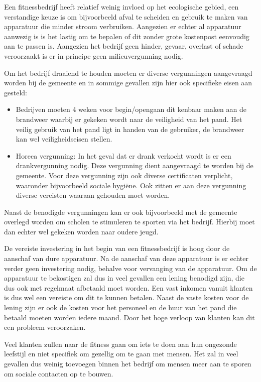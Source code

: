 Een fitnessbedrijf heeft relatief weinig invloed op het ecologische gebied, een verstandige keuze is om bijvoorbeeld afval te scheiden en gebruik te maken van apparatuur die minder stroom verbruiken. Aangezien er echter al apparatuur aanwezig is is het lastig om te bepalen of dit zonder grote kostenpost eenvoudig aan te passen is. Aangezien het bedrijf geen hinder, gevaar, overlast of schade veroorzaakt is er in principe geen milieuvergunning nodig.

 Om het bedrijf draaiend te houden moeten er diverse vergunningen aangevraagd worden bij de gemeente en in sommige gevallen zijn hier ook specifieke eisen aan gesteld:
\begin{itemize}
        \item Bedrijven moeten 4 weken voor begin/opengaan dit kenbaar maken aan de brandweer waarbij er gekeken wordt naar de veiligheid van het pand. Het veilig gebruik van het pand ligt in handen van de gebruiker, de brandweer kan wel veiligheidseisen stellen.
        \item Horeca vergunning: In het geval dat er drank verkocht wordt is er een drankvergunning nodig. Deze vergunning dient aangevraagd te worden bij de gemeente. Voor deze vergunning zijn ook diverse certificaten verplicht, waaronder bijvoorbeeld sociale hygiëne. Ook zitten er aan deze vergunning diverse vereisten waaraan gehouden moet worden.
\end{itemize}

Naast de benodigde vergunningen kan er ook bijvoorbeeld met de gemeente overlegd worden om scholen te stimuleren te sporten via het bedrijf. Hierbij moet dan echter wel gekeken worden naar oudere jeugd.

De vereiste investering in het begin van een fitnessbedrijf is hoog door de aanschaf van dure apparatuur. Na de aanschaf van deze apparatuur is er echter verder geen investering nodig, behalve voor vervanging van de apparatuur. Om de apparatuur te bekostigen zal dus in veel gevallen een lening benodigd zijn, die dus ook met regelmaat afbetaald moet worden. Een vast inkomen vanuit klanten is dus wel een vereiste om dit te kunnen betalen. Naast de vaste kosten voor de lening zijn er ook de kosten voor het personeel en de huur van het pand die betaald moeten worden iedere maand. Door het hoge verloop van klanten kan dit een probleem veroorzaken.

Veel klanten zullen naar de fitness gaan om iets te doen aan hun ongezonde leefstijl en niet specifiek om gezellig om te gaan met mensen. Het zal in veel gevallen dus weinig toevoegen binnen het bedrijf om mensen meer aan te sporen om sociale contacten op te bouwen.

